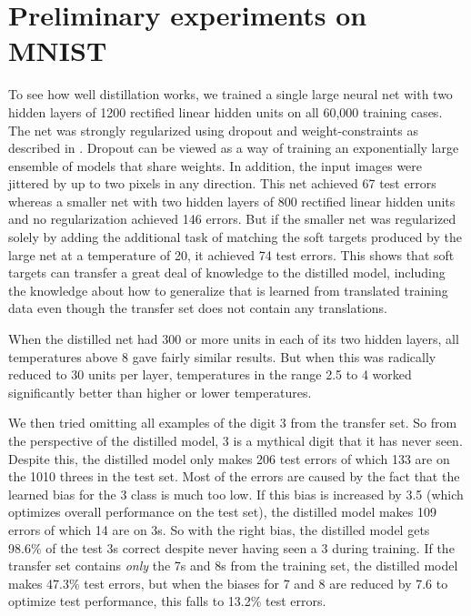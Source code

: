 \section{Preliminary experiments on MNIST}

To see how well distillation works, we trained a single large neural
net with two hidden layers of 1200 rectified linear hidden units on
all 60,000 training cases. The net was strongly regularized using
dropout and weight-constraints as described in \cite{dropout}. Dropout
can be viewed as a way of training an exponentially large ensemble of
models that share weights. In addition, the input images were jittered
by up to two pixels in any direction.  This net achieved 67 test
errors whereas a smaller net with two hidden layers of 800 rectified
linear hidden units and no regularization achieved 146 errors. But if
the smaller net was regularized solely by adding the additional task
of matching the soft targets produced by the large net at a
temperature of 20, it achieved 74 test errors. This shows that soft
targets can transfer a great deal of knowledge to the distilled model,
including the knowledge about how to generalize that is learned from
translated training data even though the transfer set does not contain
any translations.

When the distilled net had 300 or more units in each of its two hidden
layers, all temperatures above 8 gave fairly similar results.  But
when this was radically reduced to 30 units per layer, temperatures in the range
2.5 to 4 worked significantly better than higher or lower
temperatures.

We then tried omitting all examples of the digit 3 from the transfer set.  So from the perspective of the distilled
model, 3 is a mythical digit that it has never seen. Despite this, the distilled model only makes 206 test errors of
which 133 are on the 1010 threes in the test set.  Most of the errors are caused by the fact that the learned bias for
the 3 class is much too low. If this bias is increased by 3.5 (which optimizes overall performance on the test set), the
distilled model makes 109 errors of which 14 are on 3s.  So with the right bias, the distilled model gets 98.6\% of
the test 3s correct despite never having seen a 3 during training. If the transfer set contains {\it only} the 7s and 8s from
the training set, the distilled model makes 47.3\% test errors, but when the biases for 7 and 8 are reduced by 7.6 to
optimize test performance, this falls to 13.2\% test errors.



